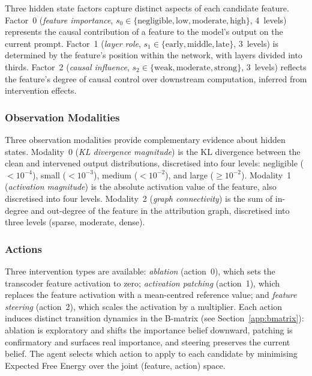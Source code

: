 Three hidden state factors capture distinct aspects of each candidate
feature.  Factor~0 (\emph{feature importance},
$s_0 \in \{\text{negligible}, \text{low}, \text{moderate},
\text{high}\}$, 4~levels) represents the causal contribution of a
feature to the model's output on the current prompt.  Factor~1
(\emph{layer role},
$s_1 \in \{\text{early}, \text{middle}, \text{late}\}$, 3~levels) is
determined by the feature's position within the network, with layers
divided into thirds.  Factor~2 (\emph{causal influence},
$s_2 \in \{\text{weak}, \text{moderate}, \text{strong}\}$, 3~levels)
reflects the feature's degree of causal control over downstream
computation, inferred from intervention effects.

\subsubsection{Observation Modalities}

Three observation modalities provide complementary evidence about
hidden states.  Modality~0 (\emph{KL divergence magnitude}) is the
KL divergence between the clean and intervened output distributions,
discretised into four levels: negligible ($<10^{-4}$), small
($<10^{-3}$), medium ($<10^{-2}$), and large ($\geq 10^{-2}$).
Modality~1 (\emph{activation magnitude}) is the absolute activation
value of the feature, also discretised into four levels.  Modality~2
(\emph{graph connectivity}) is the sum of in-degree and out-degree
of the feature in the attribution graph, discretised into three
levels (sparse, moderate, dense).

\subsubsection{Actions}

Three intervention types are available: \emph{ablation} (action~0),
which sets the transcoder feature activation to zero;
\emph{activation patching} (action~1), which replaces the feature
activation with a mean-centred reference value; and
\emph{feature steering} (action~2), which scales the activation
by a multiplier.  Each action induces distinct transition dynamics
in the B-matrix (see Section~\ref{app:bmatrix}): ablation is
exploratory and shifts the importance belief downward, patching is
confirmatory and surfaces real importance, and steering preserves
the current belief.  The agent selects which action to apply to
each candidate by minimising Expected Free Energy over the joint
(feature, action) space.


